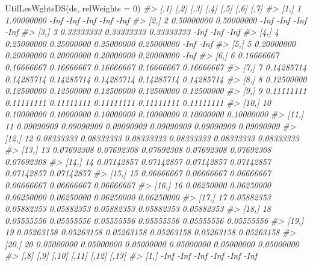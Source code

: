 \documentclass[
]{book}
\newenvironment{Shaded}{\begin{snugshade}}{\end{snugshade}}
\newcommand{\AttributeTok}[1]{\textcolor[rgb]{0.77,0.63,0.00}{#1}}
\newcommand{\CommentTok}[1]{\textcolor[rgb]{0.56,0.35,0.01}{\textit{#1}}}
\newcommand{\DecValTok}[1]{\textcolor[rgb]{0.00,0.00,0.81}{#1}}
\newcommand{\FunctionTok}[1]{\textcolor[rgb]{0.00,0.00,0.00}{#1}}
\newcommand{\NormalTok}[1]{#1}
\begin{document}
\begin{Shaded}
\begin{Highlighting}[]
\FunctionTok{UtilLesWghtsDS}\NormalTok{(ds, }\AttributeTok{relWeights =} \DecValTok{0}\NormalTok{)}
\CommentTok{\#\textgreater{}       [,1]       [,2]       [,3]       [,4]       [,5]       [,6]       [,7]}
\CommentTok{\#\textgreater{}  [1,]    1 1.00000000       {-}Inf       {-}Inf       {-}Inf       {-}Inf       {-}Inf}
\CommentTok{\#\textgreater{}  [2,]    2 0.50000000 0.50000000       {-}Inf       {-}Inf       {-}Inf       {-}Inf}
\CommentTok{\#\textgreater{}  [3,]    3 0.33333333 0.33333333 0.33333333       {-}Inf       {-}Inf       {-}Inf}
\CommentTok{\#\textgreater{}  [4,]    4 0.25000000 0.25000000 0.25000000 0.25000000       {-}Inf       {-}Inf}
\CommentTok{\#\textgreater{}  [5,]    5 0.20000000 0.20000000 0.20000000 0.20000000 0.20000000       {-}Inf}
\CommentTok{\#\textgreater{}  [6,]    6 0.16666667 0.16666667 0.16666667 0.16666667 0.16666667 0.16666667}
\CommentTok{\#\textgreater{}  [7,]    7 0.14285714 0.14285714 0.14285714 0.14285714 0.14285714 0.14285714}
\CommentTok{\#\textgreater{}  [8,]    8 0.12500000 0.12500000 0.12500000 0.12500000 0.12500000 0.12500000}
\CommentTok{\#\textgreater{}  [9,]    9 0.11111111 0.11111111 0.11111111 0.11111111 0.11111111 0.11111111}
\CommentTok{\#\textgreater{} [10,]   10 0.10000000 0.10000000 0.10000000 0.10000000 0.10000000 0.10000000}
\CommentTok{\#\textgreater{} [11,]   11 0.09090909 0.09090909 0.09090909 0.09090909 0.09090909 0.09090909}
\CommentTok{\#\textgreater{} [12,]   12 0.08333333 0.08333333 0.08333333 0.08333333 0.08333333 0.08333333}
\CommentTok{\#\textgreater{} [13,]   13 0.07692308 0.07692308 0.07692308 0.07692308 0.07692308 0.07692308}
\CommentTok{\#\textgreater{} [14,]   14 0.07142857 0.07142857 0.07142857 0.07142857 0.07142857 0.07142857}
\CommentTok{\#\textgreater{} [15,]   15 0.06666667 0.06666667 0.06666667 0.06666667 0.06666667 0.06666667}
\CommentTok{\#\textgreater{} [16,]   16 0.06250000 0.06250000 0.06250000 0.06250000 0.06250000 0.06250000}
\CommentTok{\#\textgreater{} [17,]   17 0.05882353 0.05882353 0.05882353 0.05882353 0.05882353 0.05882353}
\CommentTok{\#\textgreater{} [18,]   18 0.05555556 0.05555556 0.05555556 0.05555556 0.05555556 0.05555556}
\CommentTok{\#\textgreater{} [19,]   19 0.05263158 0.05263158 0.05263158 0.05263158 0.05263158 0.05263158}
\CommentTok{\#\textgreater{} [20,]   20 0.05000000 0.05000000 0.05000000 0.05000000 0.05000000 0.05000000}
\CommentTok{\#\textgreater{}             [,8]       [,9]      [,10]      [,11]      [,12]      [,13]}
\CommentTok{\#\textgreater{}  [1,]       {-}Inf       {-}Inf       {-}Inf       {-}Inf       {-}Inf       {-}Inf}

\end{Highlighting}
\end{Shaded}
\end{document}
